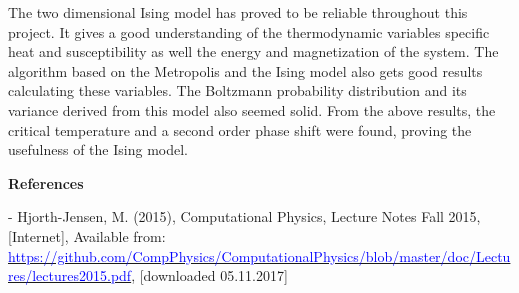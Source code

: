 \documentclass[10pt,a4paper]{article}
\begin{document}
\noindent The two dimensional Ising model has proved to be reliable throughout this project. It gives a good understanding of the thermodynamic variables specific heat and susceptibility as well the energy and magnetization of the system. The algorithm based on the Metropolis and the Ising model also gets good results calculating these variables. The Boltzmann probability distribution and its variance derived from this model also seemed solid. From the above results, the critical temperature and a second order phase shift were found, proving the usefulness of the Ising model.

\newpage

\begin{center}
{\LARGE\bf References}
\end{center}

\noindent - Hjorth-Jensen, M. (2015), Computational Physics, Lecture Notes Fall 2015, [Internet], Available from: \href{https://github.com/CompPhysics/ComputationalPhysics/blob/master/doc/Lectures/lectures2015.pdf}{\textcolor{blue}{https://github.com/CompPhysics/ComputationalPhysics/blob/master/doc/Lectures/lectures2015.pdf}}, [downloaded 05.11.2017]
\end{document}
